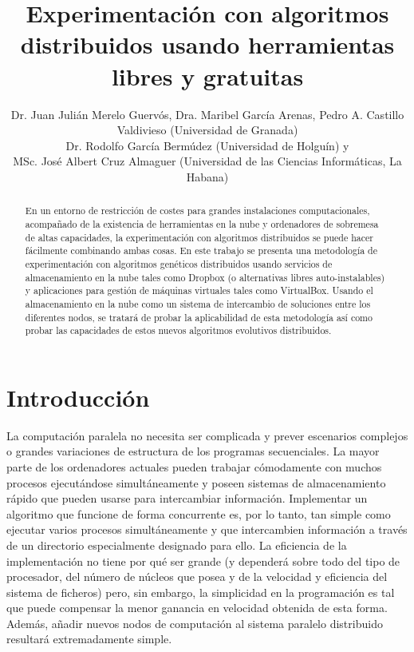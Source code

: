 \documentclass{article}
\title{Experimentación con algoritmos distribuidos usando herramientas libres y gratuitas}
\author{Dr. Juan Julián Merelo Guervós, Dra. Maribel García Arenas, Pedro A. Castillo Valdivieso (Universidad de Granada)\\
Dr. Rodolfo García Bermúdez (Universidad de Holguín) y \\
MSc. José Albert Cruz Almaguer (Universidad de las Ciencias Informáticas, La Habana)
}
\begin{document}
\maketitle

\begin{abstract}
En un entorno de restricción de costes para grandes instalaciones
computacionales, acompañado de la existencia de herramientas en la nube
y ordenadores de sobremesa de altas capacidades, la experimentación
con algoritmos distribuidos se puede hacer fácilmente combinando ambas
cosas. En este trabajo se presenta una metodología de experimentación
con algoritmos genéticos distribuidos usando servicios de
almacenamiento en la nube tales como Dropbox (o alternativas libres
auto-instalables) y aplicaciones para gestión de máquinas virtuales
tales como VirtualBox. Usando el almacenamiento en la nube como un
sistema de intercambio de soluciones entre los diferentes nodos, se
tratará de probar la aplicabilidad de esta metodología así como probar
las capacidades de estos nuevos algoritmos evolutivos distribuidos. 
\end{abstract}

\section{Introducción}

La computación paralela no necesita ser complicada y prever escenarios
complejos o grandes variaciones de estructura de los programas
secuenciales. La mayor parte de los ordenadores actuales pueden
trabajar cómodamente con muchos procesos ejecutándose simultáneamente
y poseen sistemas de almacenamiento rápido que pueden usarse para
intercambiar información. Implementar un algoritmo que funcione de
forma concurrente es, por lo tanto, tan simple como ejecutar varios
procesos simultáneamente y que intercambien información a través de un
directorio especialmente designado para ello. La eficiencia de la
implementación no tiene por qué ser grande (y dependerá sobre todo del
tipo de procesador, del número de núcleos que posea y de la velocidad
y eficiencia del sistema de ficheros) pero, sin embargo, la
simplicidad en la programación es tal que puede compensar la menor
ganancia en velocidad obtenida de esta forma. 
Además, añadir nuevos nodos de computación al sistema paralelo distribuido 
resultará extremadamente simple.
\end{document}
